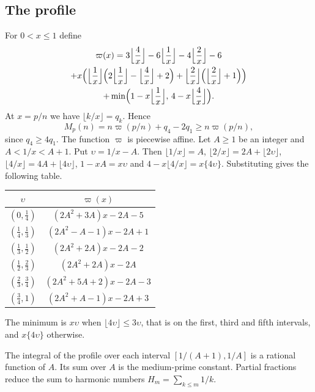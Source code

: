 \documentclass[11pt]{amsart}
\theoremstyle{definition}
\theoremstyle{remark}
\numberwithin{equation}{section}
\begin{document}
\subsection{The profile}\label{tp:ssec:profile}
For $0<x\le1$ define
\begin{multline*}
 \varpi(x)=3\Bigl\lfloor\frac4x\Bigr\rfloor-6\Bigl\lfloor\frac1x\Bigr\rfloor-4\Bigl\lfloor\frac2x\Bigr\rfloor-6\\
 +x\Bigl(\Bigl\lfloor\frac1x\Bigr\rfloor\Bigl(2\Bigl\lfloor\frac1x\Bigr\rfloor-\Bigl\lfloor\frac4x\Bigr\rfloor+2\Bigr)
 +\Bigl\lfloor\frac2x\Bigr\rfloor\Bigl(\Bigl\lfloor\frac2x\Bigr\rfloor+1\Bigr)\Bigr)\\
 +\min\Bigl(1-x\Bigl\lfloor\frac1x\Bigr\rfloor,\,4-x\Bigl\lfloor\frac4x\Bigr\rfloor\Bigr).
\end{multline*}
At $x=p/n$ we have $\lfloor k/x\rfloor=q_k$. Hence
\begin{equation}\label{tp:eq:Mprofile}
 M_p(n)=n\varpi(p/n)+q_4-2q_1\ge n\varpi(p/n),
\end{equation}
since $q_4\ge4q_1$. The function $\varpi$ is piecewise affine. Let $A\ge1$ be an integer and $A<1/x<A+1$. Put
$\upsilon=1/x-A$. Then $\lfloor1/x\rfloor=A$, $\lfloor2/x\rfloor=2A+\lfloor2\upsilon\rfloor$,
$\lfloor4/x\rfloor=4A+\lfloor4\upsilon\rfloor$, $1-xA=x\upsilon$ and $4-x\lfloor4/x\rfloor=x\{4\upsilon\}$.
Substituting gives the following table.
\begin{center}
\renewcommand{\arraystretch}{1.15}
\begin{tabular}{@{}cc@{}}
\toprule
$\upsilon$ & $\varpi(x)$\\
\midrule
$(0,\frac14)$ & $(2A^2+3A)x-2A-5$\\
$(\frac14,\frac13)$ & $(2A^2-A-1)x-2A+1$\\
$(\frac13,\frac12)$ & $(2A^2+2A)x-2A-2$\\
$(\frac12,\frac23)$ & $(2A^2+2A)x-2A$\\
$(\frac23,\frac34)$ & $(2A^2+5A+2)x-2A-3$\\
$(\frac34,1)$ & $(2A^2+A-1)x-2A+3$\\
\bottomrule
\end{tabular}
\end{center}
The minimum is $x\upsilon$ when $\lfloor4\upsilon\rfloor\le3\upsilon$, that is on the first, third and fifth
intervals, and $x\{4\upsilon\}$ otherwise.

The integral of the profile over each interval $[1/(A+1),1/A]$ is a rational function of $A$. Its sum over $A$ is the
medium-prime constant. Partial fractions reduce the sum to harmonic numbers $H_m=\sum_{k\le m}1/k$.
\end{document}
